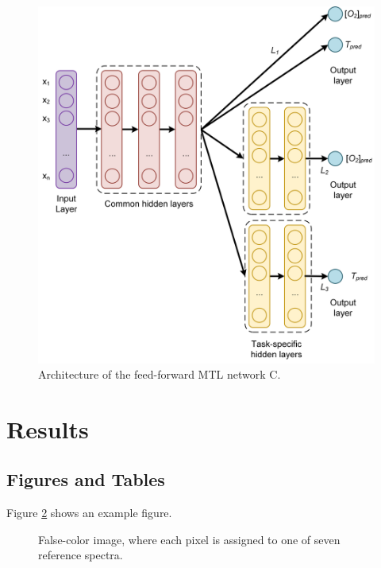\documentclass[9pt,twocolumn,twoside]{optica}
\begin{document}
\begin{figure}[hbt]
\centering
\includegraphics[width=9 cm]{figures/NN_MTL_O2_T.png}
\caption{Architecture of the feed-forward MTL network C.}
\label{NN_MTL_O2_T}
\end{figure}


\section{Results}



\subsection{Figures and Tables}

Figure \ref{fig:false-color} shows an example figure.

\begin{figure}[htbp]
\centering
{}
\caption{False-color image, where each pixel is assigned to one of seven reference spectra.}
\label{fig:false-color}
\end{figure}
\end{document}
